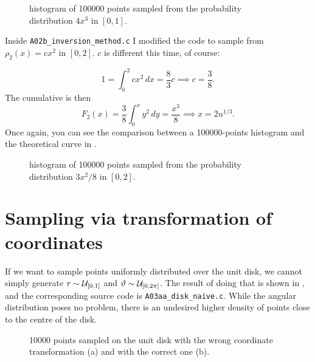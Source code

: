 \documentclass{gulartcl}
\begin{document}
\begin{figure}
    \centering
    
    \caption{histogram of \num{100000} points sampled from the probability
        distribution $4 x^3$ in $[0, 1]$.}
    \label{fig:A02a_3}
\end{figure}

Inside \texttt{A02b\_inversion\_method.c} I modified the code to sample from
$\rho_2(x) = cx^2$ in $[0, 2]$. $c$ is different this time, of course:

\begin{equation}
    1 = \int_{0}^{2} cx^2 \, dx = \frac{8}{3}c \implies c = \frac{3}{8}.
\end{equation}
The cumulative is then
\begin{equation}
    F_2(x) = \frac{3}{8} \int_{0}^{x} y^2 \, dy = \frac{x^3}{8} \implies x = 2
    u^{1/3}.
\end{equation}
Once again, you can see the comparison between a \num{100000}-points histogram
and the theoretical curve in .

\begin{figure}
    \centering
    
    \caption{histogram of \num{100000} points sampled from the probability
        distribution $3x^2/8$ in $[0, 2]$.}
    \label{fig:A02b}
\end{figure}

\section{Sampling via transformation of coordinates}
If we want to sample points uniformly distributed over the unit disk, we cannot
simply generate $r \sim \mathcal{U}_{[0, 1]}$ and $\vartheta \sim \mathcal{U}_{[0, 2\pi]}$. The
result of doing that is shown in , and the corresponding
source code is \texttt{A03aa\_disk\_naive.c}. While the angular distribution
poses no problem, there is an undesired higher density of points close to the
centre of the disk.

\begin{figure}
    \centering
    \begin{minipage}[t]{0.5\linewidth}
        \centering
        
        \subcaption{}
        \label{subfig:A03aa}
    \end{minipage}\hfill%
    \begin{minipage}[t]{0.5\linewidth} 
        \centering
            
        \subcaption{}
        \label{subfig:A03ab}
    \end{minipage}
    \caption{\num{10000} points sampled on the unit disk with the wrong
        coordinate transformation (a) and with the correct one (b).}
    \label{fig:A03a}
\end{figure}
\end{document}
